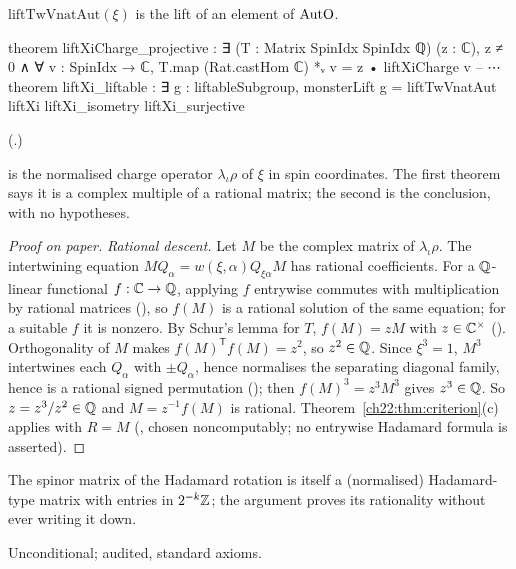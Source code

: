 \begin{theorem}[$\xi$ lifts]\label{ch22:thm:xi}
$\mathrm{liftTwVnatAut}(\xi)$ is the lift of an element of $\mathrm{AutO}$.
\end{theorem}
\begin{leancode}
theorem liftXiCharge_projective :
    ∃ (T : Matrix SpinIdx SpinIdx ℚ) (z : ℂ), z ≠ 0 ∧
      ∀ v : SpinIdx → ℂ, T.map (Rat.castHom ℂ) *ᵥ v = z • liftXiCharge v
-- ⋯
theorem liftXi_liftable : ∃ g : liftableSubgroup,
    monsterLift g = liftTwVnatAut liftXi liftXi_isometry liftXi_surjective
\end{leancode}
(.)
\begin{dictionary}
 is the normalised charge operator $\lambda_\iota\rho$ of $\xi$ in spin coordinates.  The first theorem says it
is a complex multiple of a rational matrix; the second is the conclusion, with no hypotheses.
\end{dictionary}
\begin{proof}[Proof on paper]
\emph{Rational descent.}  Let $M$ be the complex matrix of $\lambda_\iota\rho$.  The intertwining equation
$MQ_\alpha=w(\xi,\alpha)Q_{\xi\alpha}M$ has rational coefficients.  For a ${\mathbb{Q}}$-linear functional $f:{\mathbb{C}}\to{\mathbb{Q}}$, applying $f$
entrywise commutes with multiplication by rational matrices (), so $f(M)$ is a rational
solution of the same equation; for a suitable $f$ it is nonzero.  By Schur's lemma for $T$, $f(M)=zM$ with
$z\in{\mathbb{C}}^\times$ ().  Orthogonality of $M$ makes $f(M)^{\mathsf T}f(M)=z^2$, so
$z^2\in{\mathbb{Q}}$.  Since $\xi^3=1$, $M^3$ intertwines each $Q_\alpha$ with $\pm Q_\alpha$, hence normalises the separating diagonal
family, hence is a rational signed permutation (); then $f(M)^3=z^3M^3$ gives
$z^3\in{\mathbb{Q}}$.  So $z=z^3/z^2\in{\mathbb{Q}}$ and $M=z^{-1}f(M)$ is rational.  Theorem~\ref{ch22:thm:criterion}(c) applies with
$R=M$ (, chosen noncomputably; no entrywise Hadamard formula is asserted).
\end{proof}
\begin{physics}
The spinor matrix of the Hadamard rotation is itself a (normalised) Hadamard-type matrix with entries in
$2^{-k}{\mathbb{Z}}$; the argument proves its rationality without ever writing it down.
\end{physics}
\begin{status}Unconditional; audited, standard axioms.\end{status}

